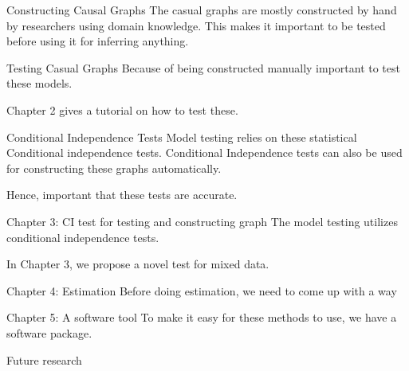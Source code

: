 \documentclass[aspectratio=169]{beamer}
\begin{document}
\begin{frame}{Constructing Causal Graphs}
	The casual graphs are mostly constructed by hand by researchers using domain knowledge.
	This makes it important to be tested before using it for inferring anything.
\end{frame}

\begin{frame}{Testing Casual Graphs}
	Because of being constructed manually important to test these models.

	Chapter 2 gives a tutorial on how to test these.
\end{frame}

\begin{frame}{Conditional Independence Tests}
	Model testing relies on these statistical Conditional independence tests.
	Conditional Independence tests can also be used for constructing these graphs
	automatically.

	Hence, important that these tests are accurate.
\end{frame}

\begin{frame}{Chapter 3: CI test for testing and constructing graph}
	The model testing utilizes conditional independence tests.

	In Chapter 3, we propose a novel test for mixed data.
\end{frame}

\begin{frame}{Chapter 4: Estimation}
	Before doing estimation, we need to come up with a way 
\end{frame}

\begin{frame}{Chapter 5: A software tool}
	To make it easy for these methods to use, we have a software package.
\end{frame}

\begin{frame}{Future research}
\end{frame}
\end{document}
